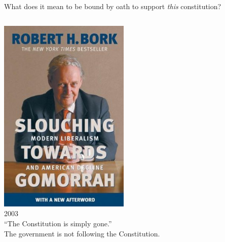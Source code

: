 \begin{frame}{What does it mean to be bound by oath to support \emph{this} constitution?}
    \begin{columns}[onlytextwidth]
            \centering
            \includegraphics[width=0.75\textwidth]{img/bork-book2.png} \\
            2003 \\

            {\large
                ``The Constitution is simply gone.'' \\
                \vspace{20pt}
                The government is not following the Constitution.
            }

    \end{columns}
\end{frame}

